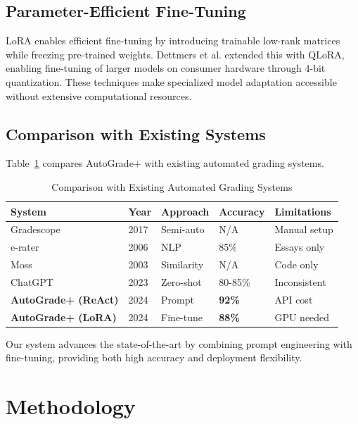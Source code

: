 \documentclass[runningheads]{llncs}
\begin{document}
\subsection{Parameter-Efficient Fine-Tuning}
LoRA \cite{hu2021lora} enables efficient fine-tuning by introducing trainable low-rank matrices while freezing pre-trained weights. Dettmers et al. \cite{dettmers2023qlora} extended this with QLoRA, enabling fine-tuning of larger models on consumer hardware through 4-bit quantization. These techniques make specialized model adaptation accessible without extensive computational resources.

\subsection{Comparison with Existing Systems}

Table~\ref{tab:related-comparison} compares AutoGrade+ with existing automated grading systems.

\begin{table}[H]
\centering
\caption{Comparison with Existing Automated Grading Systems}
\label{tab:related-comparison}
\begin{tabular}{@{}p{}p{}p{}p{}p{}@{}}
\toprule
System & Year & Approach & Accuracy & Limitations \\
\midrule
Gradescope & 2017 & Semi-auto & N/A & Manual setup \\
e-rater & 2006 & NLP & 85\% & Essays only \\
Moss & 2003 & Similarity & N/A & Code only \\
ChatGPT & 2023 & Zero-shot & 80-85\% & Inconsistent \\
\textbf{AutoGrade+ (ReAct)} & 2024 & Prompt & \textbf{92\%} & API cost \\
\textbf{AutoGrade+ (LoRA)} & 2024 & Fine-tune & \textbf{88\%} & GPU needed \\
\bottomrule
\end{tabular}
\end{table}

Our system advances the state-of-the-art by combining prompt engineering with fine-tuning, providing both high accuracy and deployment flexibility.

\section{Methodology}
\end{document}
